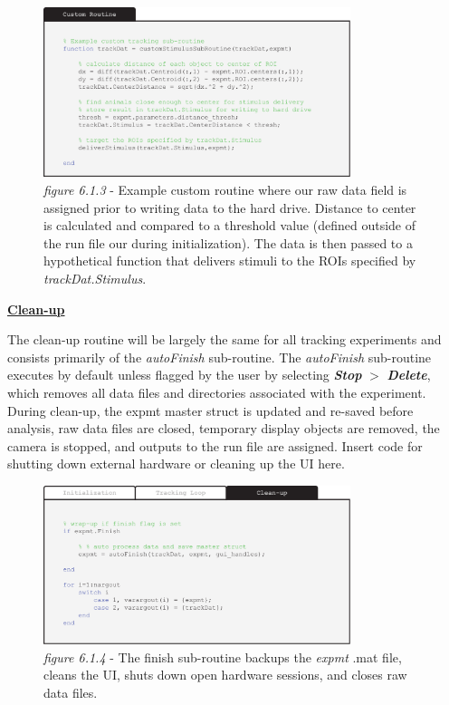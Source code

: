 \documentclass[11pt]{article}
\begin{document}
\begin{figure}[h!]
	\begin{center}
		\includegraphics[width=0.8\textwidth]{images/custom_exp/custom_routine.pdf}
		\caption*{\footnotesize {\textit{figure 6.1.3} - Example custom routine where our raw data field is assigned prior to writing data to the hard drive. Distance to center is calculated and compared to a threshold value (defined outside of the run file our during initialization). The data is then passed to a hypothetical function that delivers stimuli to the ROIs specified by \textit{trackDat.Stimulus}.}}
	\end{center}
\end{figure}

\newpage
\textbf{\underline{Clean-up}}

The clean-up routine will be largely the same for all tracking experiments and consists primarily of the \textit{autoFinish} sub-routine. The \textit{autoFinish} sub-routine executes by default unless flagged by the user by selecting \textbf{\textit{Stop}} $>$ \textbf{\textit{Delete}}, which removes all data files and directories associated with the experiment. During clean-up, the expmt master struct is updated and re-saved before analysis, raw data files are closed, temporary display objects are removed, the camera is stopped, and outputs to the run file are assigned. Insert code for shutting down external hardware or cleaning up the UI here.

\begin{figure}[h!]
	\vspace*{0.75cm}
	\begin{center}
		\includegraphics[width=0.8\textwidth]{images/custom_exp/clean_up.pdf}
		\caption*{\footnotesize {\textit{figure 6.1.4} - The finish sub-routine backups the \textit{expmt} .mat file, cleans the UI, shuts down open hardware sessions, and closes raw data files.}}
	\end{center}
\end{figure}
\end{document}
